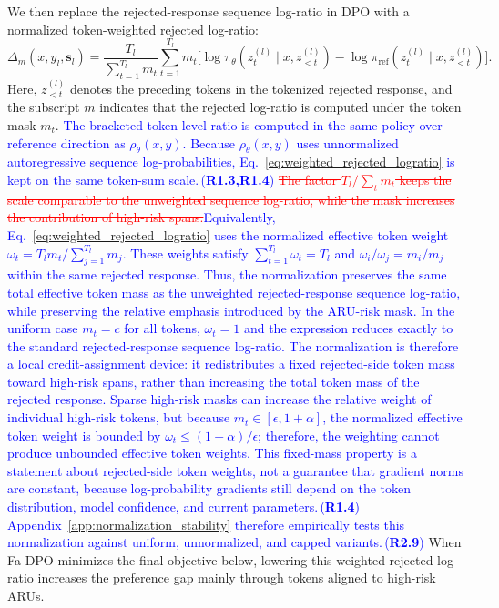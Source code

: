 \documentclass[a4paper,fleqn,doubleblind]{cas-sc}
\DeclareRobustCommand{\deleted}[1]{\textcolor{red}{\sout{#1}}}
\DeclareRobustCommand{\added}[1]{\textcolor{blue}{#1}}
\DeclareRobustCommand{\revtag}[1]{\textcolor{blue}{\scriptsize\,(\textbf{#1})}}
\begin{document}
We then replace the rejected-response sequence log-ratio in DPO with a normalized token-weighted rejected log-ratio:
\begin{equation}
\label{eq:weighted_rejected_logratio}
\Delta_m(x,y_l,\mathbf{s}_l)
=
\frac{T_l}{\sum_{t=1}^{T_l} m_t}
\sum_{t=1}^{T_l}
m_t
\Big[
\log \pi_\theta(z^{(l)}_t \mid x, z^{(l)}_{<t})
-
\log \pi_{\text{ref}}(z^{(l)}_t \mid x, z^{(l)}_{<t})
\Big].
\end{equation}
Here, $z^{(l)}_{<t}$ denotes the preceding tokens in the tokenized rejected response, and the subscript $m$ indicates that the rejected log-ratio is computed under the token mask $m_t$. \added{The bracketed token-level ratio is computed in the same policy-over-reference direction as $\rho_\theta(x,y)$. Because $\rho_\theta(x,y)$ uses unnormalized autoregressive sequence log-probabilities, Eq.~\ref{eq:weighted_rejected_logratio} is kept on the same token-sum scale.}\revtag{R1.3,R1.4} \deleted{The factor $T_l/\sum_t m_t$ keeps the scale comparable to the unweighted sequence log-ratio, while the mask increases the contribution of high-risk spans.}\added{Equivalently, Eq.~\ref{eq:weighted_rejected_logratio} uses the normalized effective token weight $\omega_t=T_lm_t/\sum_{j=1}^{T_l}m_j$. These weights satisfy $\sum_{t=1}^{T_l}\omega_t=T_l$ and $\omega_i/\omega_j=m_i/m_j$ within the same rejected response. Thus, the normalization preserves the same total effective token mass as the unweighted rejected-response sequence log-ratio, while preserving the relative emphasis introduced by the ARU-risk mask. In the uniform case $m_t=c$ for all tokens, $\omega_t=1$ and the expression reduces exactly to the standard rejected-response sequence log-ratio. The normalization is therefore a local credit-assignment device: it redistributes a fixed rejected-side token mass toward high-risk spans, rather than increasing the total token mass of the rejected response. Sparse high-risk masks can increase the relative weight of individual high-risk tokens, but because $m_t\in[\epsilon,1+\alpha]$, the normalized effective token weight is bounded by $\omega_t\le (1+\alpha)/\epsilon$; therefore, the weighting cannot produce unbounded effective token weights. This fixed-mass property is a statement about rejected-side token weights, not a guarantee that gradient norms are constant, because log-probability gradients still depend on the token distribution, model confidence, and current parameters.}\revtag{R1.4} \added{Appendix~\ref{app:normalization_stability} therefore empirically tests this normalization against uniform, unnormalized, and capped variants.}\revtag{R2.9} When Fa-DPO minimizes the final objective below, lowering this weighted rejected log-ratio increases the preference gap mainly through tokens aligned to high-risk ARUs.
\end{document}
